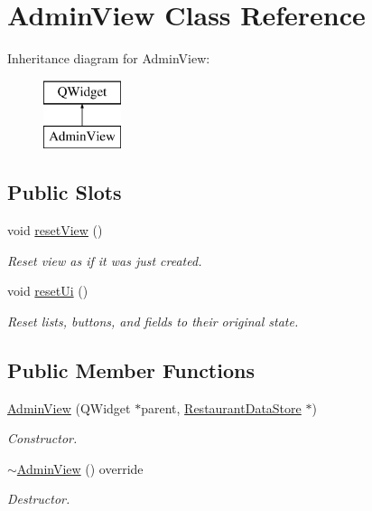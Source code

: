 \hypertarget{classAdminView}{\section{Admin\-View Class Reference}
\label{classAdminView}
}
Inheritance diagram for Admin\-View\-:\begin{figure}[H]
\begin{center}
\leavevmode
\includegraphics[height=2.000000cm]{classAdminView}
\end{center}
\end{figure}
\subsection*{Public Slots}
\begin{DoxyCompactItemize}
\item 
void \hyperlink{classAdminView_a0bc04afd4bcbf69f024599588b2caaaf}{reset\-View} ()
\begin{DoxyCompactList}\small\item\em Reset view as if it was just created. \end{DoxyCompactList}\item 
void \hyperlink{classAdminView_a383de7d879883a00b48eb32d614766de}{reset\-Ui} ()
\begin{DoxyCompactList}\small\item\em Reset lists, buttons, and fields to their original state. \end{DoxyCompactList}\end{DoxyCompactItemize}
\subsection*{Public Member Functions}
\begin{DoxyCompactItemize}
\item 
\hyperlink{classAdminView_a68e994ce28ee7af9fc8b0d87d5fb8edf}{Admin\-View} (Q\-Widget $\ast$parent, \hyperlink{classRestaurantDataStore}{Restaurant\-Data\-Store} $\ast$)
\begin{DoxyCompactList}\small\item\em Constructor. \end{DoxyCompactList}\item 
\hyperlink{classAdminView_acfefbeacc19672ae9bd0e365728c63ab}{$\sim$\-Admin\-View} () override
\begin{DoxyCompactList}\small\item\em Destructor. \end{DoxyCompactList}\end{DoxyCompactItemize}



